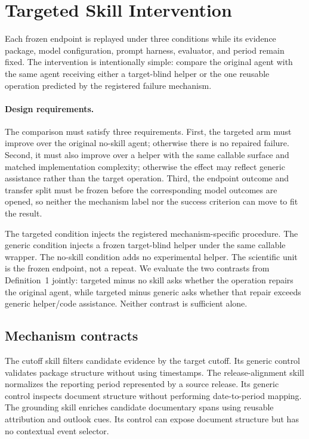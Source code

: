\section{Targeted Skill Intervention}
\label{sec:intervention}
Each frozen endpoint is replayed under three conditions while its evidence package, model configuration, prompt harness, evaluator, and period remain fixed. The intervention is intentionally simple: compare the original agent with the same agent receiving either a target-blind helper or the one reusable operation predicted by the registered failure mechanism.

\paragraph{Design requirements.}
The comparison must satisfy three requirements. First, the targeted arm must improve over the original no-skill agent; otherwise there is no repaired failure. Second, it must also improve over a helper with the same callable surface and matched implementation complexity; otherwise the effect may reflect generic assistance rather than the target operation. Third, the endpoint outcome and transfer split must be frozen before the corresponding model outcomes are opened, so neither the mechanism label nor the success criterion can move to fit the result.

The targeted condition injects the registered mechanism-specific procedure. The generic condition injects a frozen target-blind helper under the same callable wrapper. The no-skill condition adds no experimental helper. The scientific unit is the frozen endpoint, not a repeat. We evaluate the two contrasts from Definition~1 jointly: targeted minus no skill asks whether the operation repairs the original agent, while targeted minus generic asks whether that repair exceeds generic helper/code assistance. Neither contrast is sufficient alone.

\subsection{Mechanism contracts}
The cutoff skill filters candidate evidence by the target cutoff. Its generic control validates package structure without using timestamps. The release-alignment skill normalizes the reporting period represented by a source release. Its generic control inspects document structure without performing date-to-period mapping. The grounding skill enriches candidate documentary spans using reusable attribution and outlook cues. Its control can expose document structure but has no contextual event selector.

